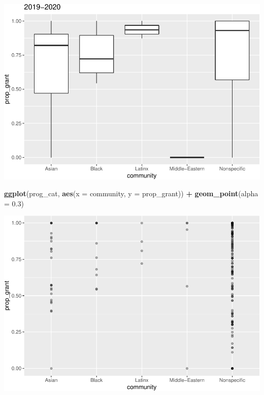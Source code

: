 \documentclass[]{article}
\newenvironment{Shaded}{\begin{snugshade}}{\end{snugshade}}
\newcommand{\DataTypeTok}[1]{\textcolor[rgb]{0.13,0.29,0.53}{#1}}
\newcommand{\FloatTok}[1]{\textcolor[rgb]{0.00,0.00,0.81}{#1}}
\newcommand{\KeywordTok}[1]{\textcolor[rgb]{0.13,0.29,0.53}{\textbf{#1}}}
\newcommand{\NormalTok}[1]{#1}
\newcommand{\OperatorTok}[1]{\textcolor[rgb]{0.81,0.36,0.00}{\textbf{#1}}}
\newcommand{\StringTok}[1]{\textcolor[rgb]{0.31,0.60,0.02}{#1}}
\begin{document}
\begin{Shaded}
\end{Shaded}

\includegraphics{sofc-funding_files/figure-latex/unnamed-chunk-6-5.pdf}

\begin{Shaded}
\begin{Highlighting}[]
\KeywordTok{ggplot}\NormalTok{(prog_cat, }\KeywordTok{aes}\NormalTok{(}\DataTypeTok{x =}\NormalTok{ community, }\DataTypeTok{y =}\NormalTok{ prop_grant)) }\OperatorTok{+}
\StringTok{  }\KeywordTok{geom_point}\NormalTok{(}\DataTypeTok{alpha =} \FloatTok{0.3}\NormalTok{)}
\end{Highlighting}
\end{Shaded}

\includegraphics{sofc-funding_files/figure-latex/unnamed-chunk-6-6.pdf}
\end{document}
